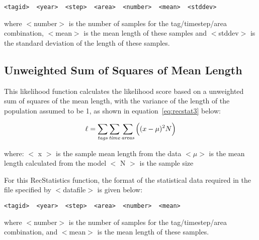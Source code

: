 \documentclass[10pt,twoside]{book}
\begin{document}
{\small\begin{verbatim}
<tagid>  <year>  <step>  <area>  <number>  <mean>  <stddev>
\end{verbatim}}

where $<$number$>$ is the number of samples for the tag/timestep/area combination, $<$mean$>$ is the mean length of these samples and $<$stddev$>$ is the standard deviation of the length of these samples.

\subsection{Unweighted Sum of Squares of Mean Length}
This likelihood function calculates the likelihood score based on a unweighted sum of squares of the mean length, with the variance of the length of the population assumed to be 1, as shown in equation~\ref{eq:recstat3} below:

\begin{equation}\label{eq:recstat3}
\ell = \sum_{\it tags}\sum_{\it time}\sum_{\it areas} \Big((x-\mu)^2 N\Big)
\end{equation}

where:\newline
$<$ x $>$ is the sample mean length from the data\newline
$<\mu>$ is the mean length calculated from the model\newline
$<$ N $>$ is the sample size

\bigskip
For this RecStatistics function, the format of the statistical data required in the file specified by $<$datafile$>$ is given below:

{\small\begin{verbatim}
<tagid>  <year>  <step>  <area>  <number>  <mean>
\end{verbatim}}

where $<$number$>$ is the number of samples for the tag/timestep/area combination, and $<$mean$>$ is the mean length of these samples.

\end{document}

